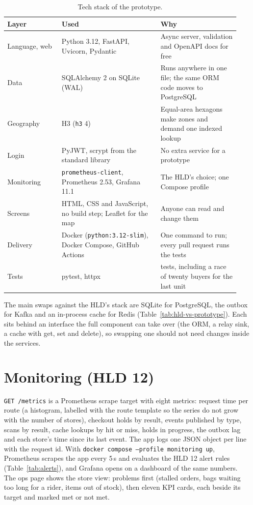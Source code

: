 \begin{table}[ht]
  \centering
  \footnotesize
  \begin{tabular}{@{}>{\raggedright\arraybackslash}p{0.22\linewidth}>{\raggedright\arraybackslash}p{0.4\linewidth}
                  >{\raggedright\arraybackslash}p{0.32\linewidth}@{}}
    \toprule
    Layer & Used & Why \\
    \midrule
    Language, web & Python 3.12, FastAPI, Uvicorn, Pydantic & Async server, validation and OpenAPI docs for free \\
    Data & SQLAlchemy 2 on SQLite (WAL) & Runs anywhere in one file; the same ORM code moves to PostgreSQL \\
    Geography & H3 (\texttt{h3} 4) & Equal-area hexagons make zones and demand one indexed lookup \\
    Login & PyJWT, scrypt from the standard library & No extra service for a prototype \\
    Monitoring & \texttt{prometheus-client}, Prometheus 2.53, Grafana 11.1 & The HLD's choice; one Compose profile \\
    Screens & HTML, CSS and JavaScript, no build step; Leaflet for the map & Anyone can read and change them \\
    Delivery & Docker (\texttt{python:3.12-slim}), Docker Compose, GitHub Actions & One command to run; every pull
      request runs the tests \\
    Tests & pytest, httpx & 291 tests, including a race of twenty buyers for the last unit \\
    \bottomrule
  \end{tabular}
  \caption{Tech stack of the prototype.}
  \label{tab:stack}
\end{table}

The main swaps against the HLD's stack are SQLite for PostgreSQL, the outbox for Kafka and an in-process cache for
Redis (Table~\ref{tab:hld-vs-prototype}). Each sits behind an interface the full component can take over (the ORM, a
relay sink, a cache with get, set and delete), so swapping one should not need changes inside the services.

\section{Monitoring (HLD 12)}
\label{sec:m4-monitoring}

\texttt{GET /metrics} is a Prometheus scrape target with eight metrics: request time per route (a histogram, labelled
with the route template so the series do not grow with the number of stores), checkout holds by result, events
published by type, scans by result, cache lookups by hit or miss, holds in progress, the outbox lag and each store's
time since its last event. The app logs one JSON object per line with the request id. With
\texttt{docker compose --profile monitoring up}, Prometheus scrapes the app every 5\,s and evaluates the HLD 12
alert rules (Table~\ref{tab:alerts}), and Grafana opens on a dashboard of the same numbers. The ops page shows the
store view: problems first (stalled orders, bags waiting too long for a rider, items out of stock), then eleven KPI
cards, each beside its target and marked met or not met.

